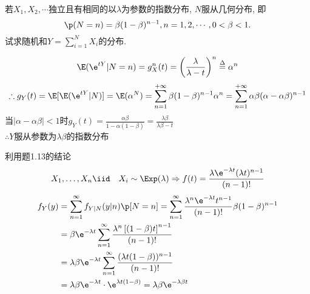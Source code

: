 \begin{problem}{1.15}
若$X_1, X_2,\cdots $独立且有相同的以$\lambda$为参数的指数分布, $N$服从几何分布, 即
\[\p(N = n) = \beta(1-\beta)^{n-1}, n = 1,2,\cdots, 0<\beta<1.\]
试求随机和$\displaystyle Y = \sum_{i=1}^N X_i$的分布.
\end{problem}
\begin{solution}[1]
	\[\E(\e^{tY}|N = n) = g^n_X (t) = \left(\frac{\lambda}{\lambda - t}\right)^n \overset{\Delta}{=} {\alpha}^n\]
	\[\therefore g_Y(t) = \E[\E(\e^{tY}|N)] = \E({\alpha}^N) = \sum^{+\infty}_{n=1}\beta(1-\beta)^{n-1}{\alpha}^n = \sum^{+\infty}_{n=1}\alpha\beta(\alpha-\alpha\beta)^{n-1}\]
	当$|\alpha -\alpha\beta|<1$时$g_Y(t)=\frac{\alpha\beta}{1-\alpha(1-\beta)} = \frac{\lambda\beta}{\lambda\beta - t}$\\
	$\therefore Y$服从参数为$\lambda\beta$的指数分布
\end{solution}
\begin{solution}[2]
	利用题1.13的结论
	\[X_1,\dots ,X_n \iid \quad X_i\sim \Exp(\lambda ) \Rightarrow f(t)=\frac{\lambda \e^{-\lambda t}(\lambda t)^{n-1}}{(n-1)!}\]
	\[\begin{aligned}
			f_Y(y) & = \sum_{n=1}^{\infty}f_{Y|N}(y|n)\p[N=n]=\sum_{n=1}^{\infty}\frac{\lambda ^n\e^{-\lambda t}t^{n-1}}{(n-1)!}\beta(1-\beta)^{n-1} \\
			       & = \beta \e^{-\lambda t}\sum_{n=1}^{\infty}\frac{\lambda ^n\left[(1-\beta)t\right]^{n-1}}{(n-1)!}                                \\
			       & = \lambda \beta \e^{-\lambda t}\sum_{n=1}^{\infty}\frac{(\lambda t(1-\beta ))^{n-1}}{(n-1)!}                                    \\
			       & = \lambda \beta \e^{-\lambda t}\cdot \e^{\lambda t(1-\beta)} = \lambda \beta \e^{-\lambda \beta t}
		\end{aligned}\]
\end{solution}

